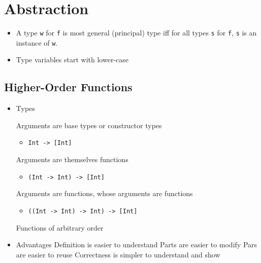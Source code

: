 
\section{Abstraction}
\begin{itemize}
     A set of types
     Function works for type \verb+t+ iff it works for all types contained in \verb+t+
    \item A type \verb+w+ for \verb+f+ is most general (principal) type iff for all types \verb+s+ for \verb+f+, \verb+s+ is an instance of \verb+w+.
    \item Type variables start with lower-case
\end{itemize}

\subsection{Higher-Order Functions}
\begin{itemize}
    \item Types
        \begin{itemize}
             Arguments are base types or constructor types
                \begin{itemize}
                    \item \verb+Int -> [Int]+
                \end{itemize}
             Arguments are themselves functions
                \begin{itemize}
                    \item \verb+(Int -> Int) -> [Int]+
                \end{itemize}
             Arguments are functions, whose arguments are functions
                \begin{itemize}
                    \item \verb+((Int -> Int) -> Int) -> [Int]+
                \end{itemize}
             Functions of arbitrary order
        \end{itemize}
    \item Advantages
    \ipro Definition is easier to understand
    \ipro Parts are easier to modify
    \ipro Pars are easier to reuse
    \ipro Correctness is simpler to understand and show
\end{itemize}


